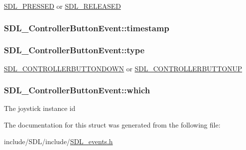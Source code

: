\hyperlink{_s_d_l__events_8h_aee81bbffbc8489bdea8fecd1232c4bd1}{S\-D\-L\-\_\-\-P\-R\-E\-S\-S\-E\-D} or \hyperlink{_s_d_l__events_8h_ad680a069f9fcab80de91b3eefdf29c3c}{S\-D\-L\-\_\-\-R\-E\-L\-E\-A\-S\-E\-D} \hypertarget{struct_s_d_l___controller_button_event_a73003712734c4d2f966db3d7c2ce826b}{
\subsubsection[{timestamp}]{ S\-D\-L\-\_\-\-Controller\-Button\-Event\-::timestamp}}\label{struct_s_d_l___controller_button_event_a73003712734c4d2f966db3d7c2ce826b}
\hypertarget{struct_s_d_l___controller_button_event_a09869d792031e47a88673d85915c209f}{
\subsubsection[{type}]{ S\-D\-L\-\_\-\-Controller\-Button\-Event\-::type}}\label{struct_s_d_l___controller_button_event_a09869d792031e47a88673d85915c209f}
\hyperlink{_s_d_l__events_8h_a3b589e89be6b35c02e0dd34a55f3fccaaafe044d5f92ac9608ded473218569474}{S\-D\-L\-\_\-\-C\-O\-N\-T\-R\-O\-L\-L\-E\-R\-B\-U\-T\-T\-O\-N\-D\-O\-W\-N} or \hyperlink{_s_d_l__events_8h_a3b589e89be6b35c02e0dd34a55f3fccaa8cb5a10b1ae0e185ef69a321d3d2d1be}{S\-D\-L\-\_\-\-C\-O\-N\-T\-R\-O\-L\-L\-E\-R\-B\-U\-T\-T\-O\-N\-U\-P} \hypertarget{struct_s_d_l___controller_button_event_a98777e88b5d5cae83eef16ffd4bcacc1}{
\subsubsection[{which}]{ S\-D\-L\-\_\-\-Controller\-Button\-Event\-::which}}\label{struct_s_d_l___controller_button_event_a98777e88b5d5cae83eef16ffd4bcacc1}
The joystick instance id 

The documentation for this struct was generated from the following file\-:\begin{DoxyCompactItemize}
\item 
include/\-S\-D\-L/include/\hyperlink{_s_d_l__events_8h}{S\-D\-L\-\_\-events.\-h}\end{DoxyCompactItemize}
